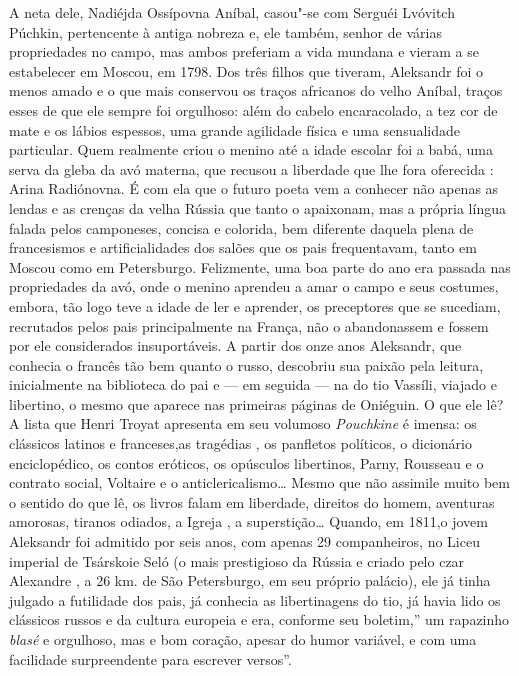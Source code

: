 A neta dele, Nadiéjda Ossípovna Aníbal, casou"-se com Serguéi Lvóvitch
Púchkin, pertencente à antiga nobreza e, ele também, senhor de várias
propriedades no campo, mas ambos preferiam a vida mundana e vieram a se
estabelecer em Moscou, em 1798. Dos três filhos que tiveram, Aleksandr
foi o menos amado e o que mais conservou os traços africanos do velho
Aníbal, traços esses de que ele sempre foi orgulhoso: além do cabelo
encaracolado, a tez cor de mate e os lábios espessos, uma grande
agilidade física e uma sensualidade particular. Quem realmente criou o
menino até a idade escolar foi a babá, uma serva da gleba da avó
materna, que recusou a liberdade que lhe fora oferecida : Arina
Radiónovna. É com ela que o futuro poeta vem a conhecer não apenas as
lendas e as crenças da velha Rússia que tanto o apaixonam, mas a própria
língua falada pelos camponeses, concisa e colorida, bem diferente
daquela plena de francesismos e artificialidades dos salões que os pais
frequentavam, tanto em Moscou como em Petersburgo. Felizmente, uma boa
parte do ano era passada nas propriedades da avó, onde o menino aprendeu
a amar o campo e seus costumes, embora, tão logo teve a idade de ler e
aprender, os preceptores que se sucediam, recrutados pelos pais
principalmente na França, não o abandonassem e fossem por ele
considerados insuportáveis. A partir dos onze anos Aleksandr, que
conhecia o francês tão bem quanto o russo, descobriu sua paixão pela
leitura, inicialmente na biblioteca do pai e --- em seguida --- na do tio
Vassíli, viajado e libertino, o mesmo que aparece nas primeiras páginas
de Oniéguin. O que ele lê? A lista que Henri Troyat apresenta em seu
volumoso \emph{Pouchkine} é imensa: os clássicos latinos e franceses,as
tragédias , os panfletos políticos, o dicionário enciclopédico, os
contos eróticos, os opúsculos libertinos, Parny, Rousseau e o contrato
social, Voltaire e o anticlericalismo\ldots{} Mesmo que não assimile muito
bem o sentido do que lê, os livros falam em liberdade, direitos do
homem, aventuras amorosas, tiranos odiados, a Igreja , a superstição\ldots{}
Quando, em 1811,o jovem Aleksandr foi admitido por seis anos, com apenas
29 companheiros, no Liceu imperial de Tsárskoie Seló (o mais
prestigioso da Rússia e criado pelo czar Alexandre , a 26 km. de São
Petersburgo, em seu próprio palácio), ele já tinha julgado a futilidade
dos pais, já conhecia as libertinagens do tio, já havia lido os
clássicos russos e da cultura europeia e era, conforme seu boletim,'' um
rapazinho \emph{blasé} e orgulhoso, mas e bom coração, apesar do humor
variável, e com uma facilidade surpreendente para escrever versos''.
